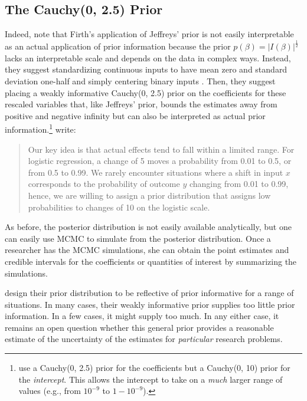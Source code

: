\documentclass[12pt]{article}
\begin{document}
\subsection*{The Cauchy(0, 2.5) Prior}

Indeed, \cite{Gelmanetal2008} note that Firth's application of Jeffreys' prior is not easily interpretable as an actual application of prior information because the prior $p(\beta) = |I(\beta)|^\frac{1}{2}$ lacks an interpretable scale and depends on the data in complex ways. 
Instead, they suggest standardizing continuous inputs to have mean zero and standard deviation one-half and simply centering binary inputs \citep{Gelman2008}. 
Then, they suggest placing a weakly informative Cauchy(0, 2.5) prior on the coefficients for these rescaled variables that, like Jeffreys' prior, bounds the estimates away from positive and negative infinity but can also be interpreted as actual prior information.\footnote{
\cite{Gelmanetal2008} use a Cauchy(0, 2.5) prior for the coefficients but a Cauchy(0, 10) prior for the \emph{intercept}. 
This allows the intercept to take on a \emph{much} larger range of values (e.g., from $10^{-9}$ to $1 - 10^{-9}$).} 
\citet[p. 1363]{Gelmanetal2008} write:
\begin{quote}
Our key idea is that actual effects tend to fall within a limited range. For logistic regression, a change of 5 moves a probability from 0.01 to 0.5, or from 0.5 to 0.99. We rarely encounter situations where a shift in input $x$ corresponds to the probability of outcome $y$ changing from 0.01 to 0.99, hence, we are willing to assign a prior distribution that assigns low probabilities to changes of 10 on the logistic scale.
\end{quote}

As before, the posterior distribution is not easily available analytically, but one can easily use MCMC to simulate from the posterior distribution. 
Once a researcher has the MCMC simulations, she can obtain the point estimates and credible intervals for the coefficients or quantities of interest by summarizing the simulations. 

\cite{Gelmanetal2008} design their prior distribution to be reflective of prior informative for a range of situations. 
In many cases, their weakly informative prior supplies too little prior information. 
In a few cases, it might supply too much. 
In any either case, it remains an open question whether this general prior provides a reasonable estimate of the uncertainty of the estimates for \emph{particular} research problems.
\end{document}
